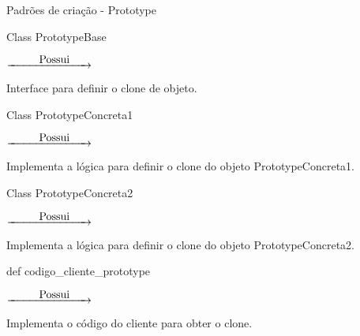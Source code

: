 \begin{frame}[t]{Padrões de criação - Prototype}
	
	
	\centering
	\begin{minipage}{4cm}
		\begin{block}{}
			Class PrototypeBase
		\end{block}
	\end{minipage} 
	$\underrightarrow{\makebox[2cm][r]{Possui}\hspace{2em}}$
	\begin{minipage}{6cm}
		\begin{block}{}
			Interface para definir o clone de objeto.
		\end{block}
	\end{minipage}
	\vfill
	\begin{minipage}{4cm}
		\begin{block}{}
			Class PrototypeConcreta1
		\end{block}
	\end{minipage} 
	$\underrightarrow{\makebox[2cm][r]{Possui}\hspace{2em}}$
	\begin{minipage}{6cm}
		\begin{block}{}
			Implementa a lógica para definir o clone do objeto PrototypeConcreta1.
		\end{block}
	\end{minipage}
	\vfill
	\begin{minipage}{4cm}
		\begin{block}{}
			Class PrototypeConcreta2
		\end{block}
	\end{minipage} 
	$\underrightarrow{\makebox[2cm][r]{Possui}\hspace{2em}}$
	\begin{minipage}{6cm}
		\begin{block}{}
			Implementa a lógica para definir o clone do objeto PrototypeConcreta2.
		\end{block}
	\end{minipage}
	\vfill
	\begin{minipage}{4cm}
		\begin{block}{}
			def codigo\_cliente\_prototype
		\end{block}
	\end{minipage} 
	$\underrightarrow{\makebox[2cm][r]{Possui}\hspace{2em}}$
	\begin{minipage}{6cm}
		\begin{block}{}
			Implementa o código do cliente para obter o clone.
		\end{block}
	\end{minipage}
\end{frame}





